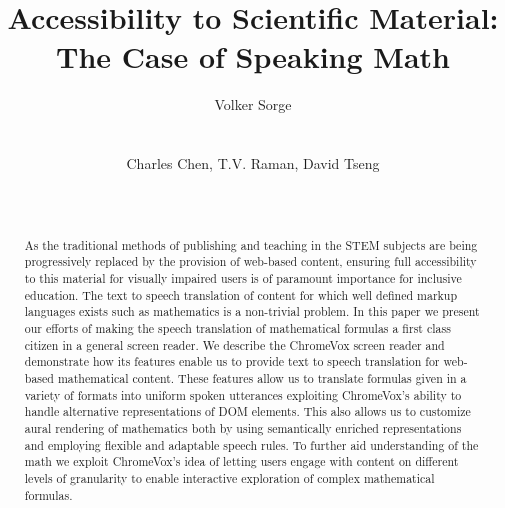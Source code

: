 \documentclass{sig-alternate}
\begin{document}
\title{Accessibility to Scientific Material:\\ The Case of Speaking Math}

\author{
%
%
  \alignauthor Volker Sorge\\
  \\
  \\
\alignauthor
Charles Chen, T.V. Raman, David Tseng\\
       \\
       \\
}


\maketitle 
\begin{abstract} 
  As the traditional methods of publishing and teaching in the
  STEM subjects are being progressively replaced by the provision
  of web-based content, ensuring full accessibility to this
  material for visually impaired users is of paramount importance
  for inclusive education. The text to speech translation of
  content for which well defined markup languages exists such as
  mathematics is a non-trivial problem. In this paper we present
  our efforts of making the speech translation of mathematical
  formulas a first class citizen in a general screen reader. We
  describe the ChromeVox screen reader and demonstrate how its
  features enable us to provide text to speech translation for
  web-based mathematical content. These features allow us to
  translate formulas given in a variety of formats into uniform
  spoken utterances exploiting ChromeVox's ability to handle
  alternative representations of DOM elements. This also allows
  us to customize aural rendering of mathematics both by using
  semantically enriched representations and employing flexible
  and adaptable speech rules. To further aid understanding of the
  math we exploit ChromeVox's idea of letting users engage with
  content on different levels of granularity to enable
  interactive exploration of complex mathematical formulas.
\end{abstract}
\end{document}
